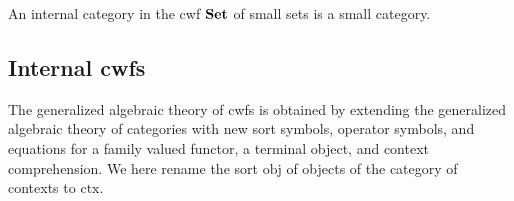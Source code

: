 \documentclass{mscs}
\newcommand{\FYI}[1]{{#1}}
\def\Obj{\mathrm{obj}}
\def\Hom{\mathrm{hom}}
\def\id{\mathrm{id}}
\newcommand{\ctx}{\mathrm{ctx}}
\begin{document}
An internal category in the cwf ${\bf Set}$ of small sets is a small category.


\subsection{Internal cwfs}\label{gat-cwf}

The generalized algebraic theory of cwfs is obtained by extending the generalized algebraic theory of categories with new sort symbols, operator symbols, and equations for a family valued functor, a terminal object, and context comprehension. We here rename the sort $\Obj$ of objects of the category of contexts to $\ctx$.
\end{document}
